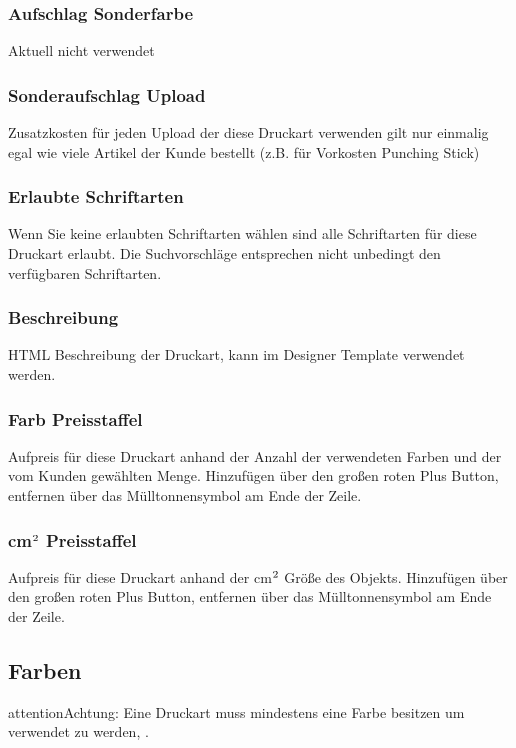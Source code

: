 \documentclass[letterpaper,10pt,ngerman]{sphinxmanual}
\begin{document}
\subsubsection{Aufschlag Sonderfarbe}
\label{\detokenize{hbe/printtypes:aufschlag-sonderfarbe}}
Aktuell nicht verwendet


\subsubsection{Sonderaufschlag Upload}
\label{\detokenize{hbe/printtypes:sonderaufschlag-upload}}
Zusatzkosten für jeden Upload der diese Druckart verwenden \sphinxhyphen{}
gilt nur einmalig egal wie viele Artikel der Kunde bestellt (z.B. für Vorkosten Punching Stick)


\subsubsection{Erlaubte Schriftarten}
\label{\detokenize{hbe/printtypes:erlaubte-schriftarten}}
Wenn Sie keine erlaubten Schriftarten wählen sind alle Schriftarten für diese Druckart erlaubt.
Die Suchvorschläge entsprechen nicht unbedingt den verfügbaren Schriftarten.


\subsubsection{Beschreibung}
\label{\detokenize{hbe/printtypes:beschreibung}}
HTML Beschreibung der Druckart, kann im Designer Template verwendet werden.


\subsubsection{Farb Preisstaffel}
\label{\detokenize{hbe/printtypes:farb-preisstaffel}}
Aufpreis für diese Druckart anhand der Anzahl der verwendeten
Farben und der vom Kunden gewählten Menge. Hinzufügen über den
großen roten Plus Button, entfernen über das Mülltonnensymbol am
Ende der Zeile.


\subsubsection{cm\(\sp{\text{2}}\) Preisstaffel}
\label{\detokenize{hbe/printtypes:cm2-preisstaffel}}
Aufpreis für diese Druckart anhand der cm\(\sp{\text{2}}\) Größe des Objekts.
Hinzufügen über den großen roten Plus Button,
entfernen über das Mülltonnensymbol am
Ende der Zeile.


\subsection{Farben}
\label{\detokenize{hbe/printtypes:farben}}
\begin{sphinxadmonition}{attention}{Achtung:}
Eine Druckart muss mindestens eine Farbe besitzen um verwendet zu werden,
.
\end{sphinxadmonition}
\end{document}
